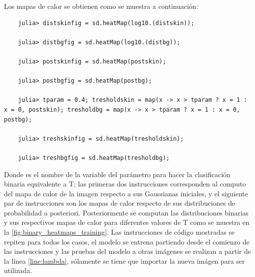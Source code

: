 Los mapas de calor se obtienen como se muestra a continuación:
\begin{verbatim}
    julia> distskinfig = sd.heatMap(log10.(distskin));

    julia> distbgfig = sd.heatMap(log10.(distbg));

    julia> postskinfig = sd.heatMap(postskin);

    julia> postbgfig = sd.heatMap(postbg);

    julia> tparam = 0.4; tresholdskin = map(x -> x > tparam ? x = 1 : x = 0, postskin); tresholdbg = map(x -> x > tparam ? x = 1 : x = 0, postbg);

    julia> treshskinfig = sd.heatMap(tresholdskin);

    julia> treshbgfig = sd.heatMap(tresholdbg);
\end{verbatim}

Donde  es el nombre de la variable del parámetro para hacer la clasificación binaria equivalente a $\text{T}$; las primeras dos instrucciones corresponden al computo del mapa de calor de la imagen respecto a sus Gaussianas iniciales, y el siguiente par de instrucciones son los mapas de calor respecto de sus distribuciones de probabilidad a posteriori. Posteriormente se computan las distribuciones binarias y sus respectivos mapas de calor para diferentes valores de $\text{T}$ como se muestra en la \cref{fig:binary_heatmaps_training}. Las instrucciones de código mostradas se repiten para todos los casos, el modelo se entrena partiendo desde el comienzo de las instrucciones y las pruebas del modelo a otras imágenes se realizan a partir de la línea \ref{line:lambda}, sólamente se tiene que importar la nueva imágen para ser utilizada.

